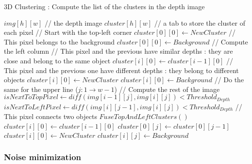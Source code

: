 \documentclass[smallextended]{svjour3}
\begin{document}
\begin{algorithm}
\caption{\label{algo:clustering}3D Clustering : Compute the list of the clusters in the depth image}
\begin{algorithmic}
\REQUIRE $img[h][w]$ // the depth image
\STATE $cluster[h][w]$  // a tab to store the cluster of each pixel
\STATE 
\STATE // Start with the top-left corner
\STATE $cluster[0][0] \leftarrow NewCluster$
\ELSE
\STATE // This pixel belongs to the background
\STATE $cluster[0][0] \leftarrow Background$
\ENDIF
\STATE 
\STATE // Compute the left column
\STATE // This pixel and the previous have similar depths : they are close and belong to the same object
\STATE $cluster[i][0] \leftarrow cluster[i-1][0]$
\ELSE
\STATE // This pixel and the previous one have different depths : they belong to different objects
\STATE $cluster[i][0] \leftarrow NewCluster$
\ENDIF
\ELSE
\STATE $cluster[i][0] \leftarrow Background$
\ENDIF
\ENDFOR
\STATE 
\STATE // Do the same for the upper line ($j:1 \rightarrow w-1$)
\STATE 
\STATE // Compute the rest of the image
\STATE $isNextToTopPixel \leftarrow diff(img[i-1][j], img[i][j]) < Threshold_{Depth}$
\STATE $isNextToLeftPixel \leftarrow diff(img[i][j-1], img[i][j]) < Threshold_{Depth}$
\STATE // This pixel connects two objects
\STATE $FuseTopAndLeftClusters()$
\STATE $cluster[i][0] \leftarrow cluster[i-1][0]$
\STATE $cluster[0][j] \leftarrow cluster[0][j-1]$
\ELSE
\STATE $cluster[i][0] \leftarrow NewCluster$
\ENDIF
\ELSE
\STATE $cluster[i][j] \leftarrow Background$
\ENDIF
\ENDFOR
\ENDFOR
\end{algorithmic}
\end{algorithm}

\subsubsection{Noise minimization}
\end{document}
